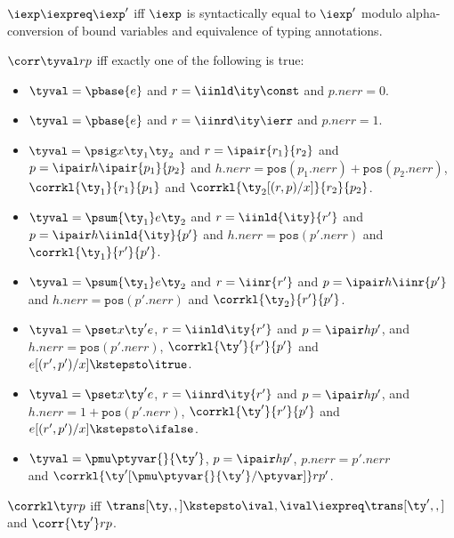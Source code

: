 \begin{definition}
  $\iexp \iexpreq \iexp'$ iff $\iexp$ is syntactically equal to $\iexp'$ 
modulo alpha-conversion of bound variables and equivalence of
typing annotations.
\label{def:op-eq}
\end{definition}

\begin{definition}
$\corr \tyval r p$ iff exactly one of the following is true:
  \begin{itemize}
  \item $\tyval = \pbase{e}$ and $r = \iinld \ity \const$ and $p.{nerr} = 0$.
  \item $\tyval = \pbase{e}$ and $r = \iinrd \ity \ierr$ and $p.{nerr} = 1$.
  \item $\tyval = \psig x {\ty_1} {\ty_2}$ and $r =\ipair {r_1} {r_2}$ and $p =
    \ipair h {\ipair {p_1} {p_2}}$ 
    and $h.{nerr} = \mathtt{pos}(p_1.{nerr}) + \mathtt{pos}(p_2.{nerr})$, $\corrkl
    {\ty_1} {r_1} {p_1}$ and $\corrkl {\ty_2[(r,p)/x]} {r_2} {p_2}$.
  \item $\tyval = \psum {\ty_1} e {\ty_2}$ and $r =\iinld {\ity}{r'}$
    and $p = \ipair h {\iinld {\ity}{p'}}$
    and $h.{nerr} = \mathtt{pos}(p'.{nerr})$ and $\corrkl
    {\ty_1} {r'} {p'}$.
  \item $\tyval = \psum {\ty_1} e {\ty_2}$ and $r =\iinr {r'}$
    and $p = \ipair h {\iinr {p'}}$
    and $h.{nerr} = \mathtt{pos}(p'.{nerr})$ and $\corrkl
    {\ty_2} {r'} {p'}$.
  \item $\tyval = \pset x {\ty'} e$, $r = \iinld \ity {r'}$ and $p =
    \ipair h {p'}$, 
    and $h.{nerr} = \mathtt{pos}(p'.{nerr})$, $\corrkl {\ty'}{r'}{p'}$
    and $e[(r',p')/x] \kstepsto\itrue$.
  \item $\tyval = \pset x {\ty'} e$, $r = \iinrd \ity {r'}$
    and $p = \ipair h {p'}$,
    and $h.{nerr} = 1 + \mathtt{pos}(p'.{nerr})$,
    $\corrkl {\ty'}{r'}{p'}$ and $e[(r',p')/x] \kstepsto \ifalse$.
  \item $\tyval = \pmu \ptyvar {} {\ty'}$, $p =
    \ipair h {p'}$, $p.{nerr} = p'.{nerr}$ \\
    and
    $\corrkl {\ty'[\pmu \ptyvar {} {\ty'}/\ptyvar]} r {p'}$.
  \end{itemize}
\end{definition}

\begin{definition}
$\corrkl \ty r p$ iff $\trans[\ty,,] \kstepsto \ival, \ival \iexpreq
\trans[\ty',,]$ and $\corr {\ty'} r p$.
\end{definition}


